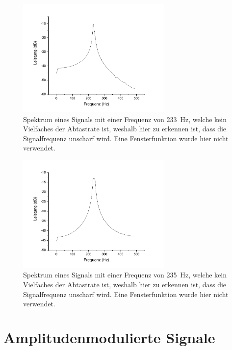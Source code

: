 \documentclass[
a4paper,
12pt,
pagesize,
ngerman
]{scrartcl}
\begin{document}
	\begin{figure}[H]  
		\includegraphics[width=0.68\textwidth]{Origin-Files/unpassend_233nonhann}
		\centering
		\caption{
			Spektrum eines Signals mit einer Frequenz von \SI{233}{\hertz}, welche kein Vielfaches der Abtastrate ist, weshalb hier zu erkennen ist, dass die Signalfrequenz unscharf wird. Eine Fensterfunktion wurde hier nicht verwendet.
		}
		\label{fig_tag3_unpassend_233hz}
		\centering
	\end{figure}
	
	\begin{figure}[H]  
		\includegraphics[width=0.68\textwidth]{Origin-Files/unpassend_235nonhann}
		\centering
		\caption{
			Spektrum eines Signals mit einer Frequenz von \SI{235}{\hertz}, welche kein Vielfaches der Abtastrate ist, weshalb hier zu erkennen ist, dass die Signalfrequenz unscharf wird. Eine Fensterfunktion wurde hier nicht verwendet.
		}
		\label{fig_tag3_unpassend_235hz}
		\centering
	\end{figure}
	
	\newpage
	
	
	\section{Amplitudenmodulierte Signale}
\end{document}
